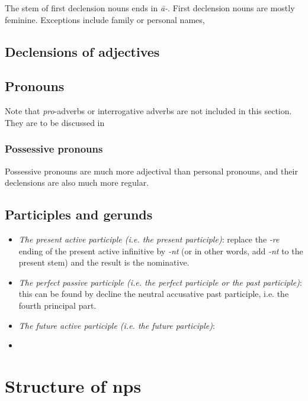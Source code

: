 \documentclass{article}
\newcommand*{\term}[1]{\emph{#1}}
\newcommand*{\corpus}[1]{\emph{#1}}
\begin{document}
The stem of first declension nouns ends in \corpus{\={a}-}.
First declension nouns are mostly feminine.
Exceptions include family or personal names,


\subsection{Declensions of adjectives}\label{sec:regular-adjective-declension}

\subsection{Pronouns}\label{sec:pronoun}

Note that \term{pro}-adverbs or interrogative adverbs are not included in this section.
They are to be discussed in 

\subsubsection{Possessive pronouns}

Possessive pronouns are much more adjectival than personal pronouns,
and their declensions are also much more regular.

\subsection{Participles and gerunds}\label{sec:participle-gerund}

\begin{itemize}
    \item \emph{The present active participle (i.e. the present participle)}: 
    replace the \corpus{-re} ending of the present active infinitive by \corpus{-nt}
    (or in other words, add \corpus{-nt} to the present stem)
    and the result is the nominative. %
    \item \emph{The perfect passive participle (i.e. the perfect participle or the past participle)}:
    this can be found by decline the neutral accusative past participle, 
    i.e. the fourth principal part.
    \item \emph{The future active participle (i.e. the future participle)}:
    
    \item \emph{}
\end{itemize}

\section{Structure of \acl{np}s}
\end{document}
